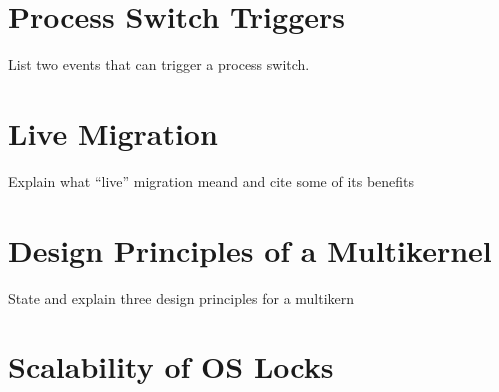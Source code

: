 \documentclass[12pt]{article}
\begin{document}
\section*{Process Switch Triggers}
List two events that can trigger a process switch.

\section*{Live Migration}
Explain what ``live'' migration meand and cite some of its benefits

\section*{Design Principles of a Multikernel}
State and explain three design principles for a multikern

\section*{Scalability of OS Locks}

{}

\end{document}
